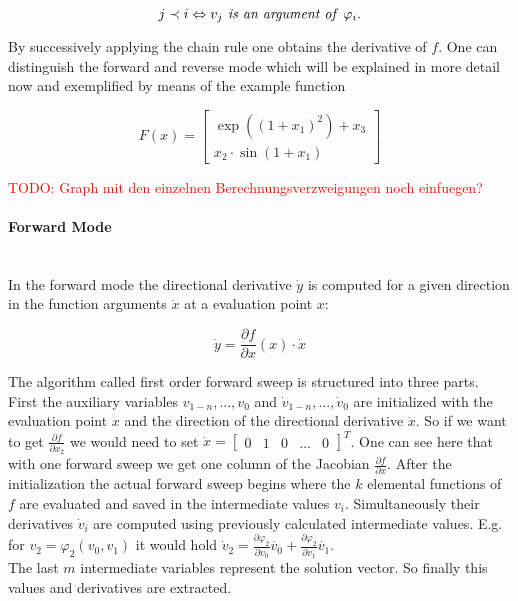 \documentclass{scrartcl}[12pt, halfparskip]
\newcommand{\todo}[1]{\textcolor{red}{TODO: #1}}
\begin{document}
\begin{equation}
j \prec i \Leftrightarrow v_j \text{\textit{ is an argument of }} \varphi_i.
\end{equation}

By successively applying the chain rule one obtains the derivative of $f$.
One can distinguish the forward and reverse mode which will be explained in more detail now and exemplified by means of the example function

\begin{equation}
F(x) = 
\begin{bmatrix}
\exp((1+x_1)^2) + x_3 \\
x_2 \cdot \sin(1+x_1)
\end{bmatrix}
\end{equation}

\todo{Graph mit den einzelnen Berechnungsverzweigungen noch einfuegen?}

\paragraph{Forward Mode}\mbox{}\\
In the forward mode the directional derivative $\dot{y}$ is computed for a given direction in the function arguments $\dot{x}$ at a evaluation point $x$:

\begin{equation}
\dot{y} = \frac{\partial f}{\partial x}(x) \cdot \dot{x}
\label{eq:AD_example}
\end{equation}

The algorithm called first order forward sweep is structured into three parts. First the auxiliary variables $v_{1-n},...,v_0$ and $\dot{v}_{1-n},...,\dot{v}_0$ are initialized with the evaluation point $x$ and the direction of the directional derivative $\dot{x}$. So if we want to get $\frac{\partial f}{\partial x_2}$ we would need to set $\dot{x} = \begin{bmatrix}
0 & 1 & 0 & \dots & 0
\end{bmatrix}^T$. One can see here that with one forward sweep we get one column of the Jacobian $ \frac{\partial f}{\partial x}$. 
After the initialization the actual forward sweep begins where the $k$ elemental functions of $f$ are evaluated and saved in the intermediate values $v_i$. Simultaneously their derivatives  $\dot{v}_i$ are computed using previously calculated intermediate values. E.g. for $v_2 = \varphi_2(v_0, v_1)$ it would hold $\dot{v}_2 = \frac{\partial \varphi_2}{\partial v_0} \dot{v_0} + \frac{\partial \varphi_2}{\partial v_1} \dot{v_1}$. \\
The last $m$ intermediate variables represent the solution vector. So finally this values and derivatives are extracted.
\end{document}

